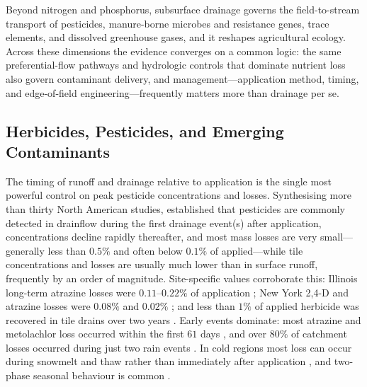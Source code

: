 Beyond nitrogen and phosphorus, subsurface drainage governs the field-to-stream
transport of pesticides, manure-borne microbes and resistance genes, trace
elements, and dissolved greenhouse gases, and it reshapes agricultural ecology.
Across these dimensions the evidence converges on a common logic: the same
preferential-flow pathways and hydrologic controls that dominate nutrient loss
also govern contaminant delivery, and management---application method, timing,
and edge-of-field engineering---frequently matters more than drainage per se.

\subsection{Herbicides, Pesticides, and Emerging Contaminants}

The timing of runoff and drainage relative to application is the single most
powerful control on peak pesticide concentrations and losses. Synthesising more
than thirty North American studies, \textcite{Kladivko2001} established that
pesticides are commonly detected in drainflow during the first drainage event(s)
after application, concentrations decline rapidly thereafter, and most mass
losses are very small---generally less than $0.5\%$ and often below $0.1\%$ of
applied---while tile concentrations and losses are usually much lower than in
surface runoff, frequently by an order of magnitude. Site-specific values
corroborate this: Illinois long-term atrazine losses were $0.11$--$0.22\%$ of
application \parencite{Kalita2006}; New York 2,4-D and atrazine losses were
$0.08\%$ and $0.02\%$ \parencite{Shalit1996}; and less than $1\%$ of applied
herbicide was recovered in tile drains over two years
\parencite{Fortin2002,Siimes2006}. Early events dominate: most atrazine and
metolachlor loss occurred within the first $61$ days \parencite{SOUTHWICK1990},
and over $80\%$ of catchment losses occurred during just two rain events
\parencite{Leu2004}. In cold regions most loss can occur during snowmelt and
thaw rather than immediately after application \parencite{Siimes2006}, and
two-phase seasonal behaviour is common \parencite{Novak2001,Dousset2004}.

